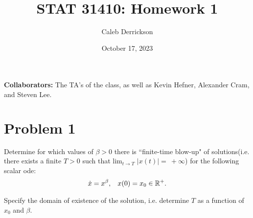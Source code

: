 

\title{STAT 31410: Homework 1}
\author{Caleb Derrickson}
\date{October 17, 2023}


\onehalfspacing
\maketitle

{\color{cit}\vspace{2mm}\noindent\textbf{Collaborators:}} The TA's of the class, as well as Kevin Hefner, Alexander Cram, and Steven Lee.

\tableofcontents

\newpage

\section{Problem 1}
Determine for which values of $\beta > 0$ there is ``finite-time blow-up" of solutions(i.e. there exists a finite $T > 0$ such that lim$_{t \rightarrow T}$ $\lvert x(t) \rvert = \ + \infty$) for the following scalar ode:
\[
\dot{x} = x^\beta, \hspace{3mm} x(0) = x_0 \in \mathbb{R}^+.
\]

Specify the domain of existence of the solution, i.e. determine $T$ as a function of $x_0$ and $\beta$.

